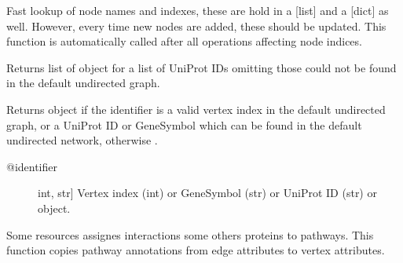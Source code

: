 \documentclass[letterpaper,10pt,english]{sphinxmanual}
\begin{document}
\begin{fulllineitems}
\begin{fulllineitems}
\label{\detokenize{reference:pypath.main.PyPath.update_vname}}
Fast lookup of node names and indexes, these are hold in a
{[}list{]} and a {[}dict{]} as well. However, every time new nodes are
added, these should be updated. This function is automatically
called after all operations affecting node indices.

\end{fulllineitems}


\begin{fulllineitems}
\label{\detokenize{reference:pypath.main.PyPath.ups}}
Returns list of  object
for a list of UniProt IDs omitting those
could not be found in the default
undirected graph.

\end{fulllineitems}


\begin{fulllineitems}
\label{\detokenize{reference:pypath.main.PyPath.v}}
Returns  object if the identifier
is a valid vertex index in the default undirected graph,
or a UniProt ID or GeneSymbol which can be found in the
default undirected network, otherwise .
\begin{description}
\item[{@identifier}] \leavevmode{[}int, str{]}
Vertex index (int) or GeneSymbol (str) or UniProt ID (str) or
 object.

\end{description}

\end{fulllineitems}


\begin{fulllineitems}
\label{\detokenize{reference:pypath.main.PyPath.vertex_pathways}}
Some resources assignes interactions some others proteins to
pathways. This function copies pathway annotations from edge
attributes to vertex attributes.


\end{fulllineitems}
\end{fulllineitems}
\end{document}
